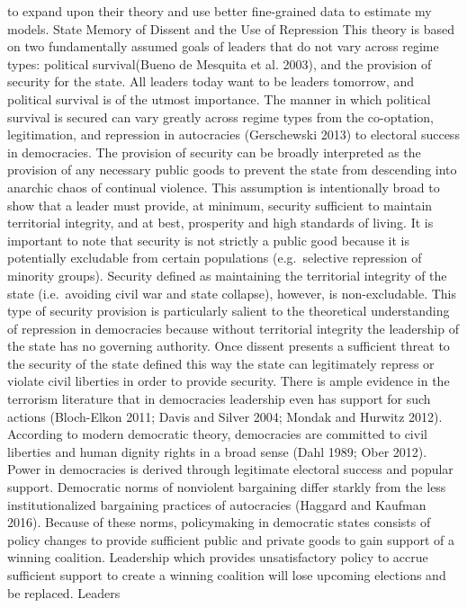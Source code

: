 \documentclass[ignorenonframetext,]{beamer}
\begin{document}
\begin{frame}[fragile]
to expand upon their theory and use better fine-grained data to estimate
my models. State Memory of Dissent and the Use of Repression This theory
is based on two fundamentally assumed goals of leaders that do not vary
across regime types: political survival(Bueno de Mesquita et al. 2003),
and the provision of security for the state. All leaders today want to
be leaders tomorrow, and political survival is of the utmost importance.
The manner in which political survival is secured can vary greatly
across regime types from the co-optation, legitimation, and repression
in autocracies (Gerschewski 2013) to electoral success in democracies.
The provision of security can be broadly interpreted as the provision of
any necessary public goods to prevent the state from descending into
anarchic chaos of continual violence. This assumption is intentionally
broad to show that a leader must provide, at minimum, security
sufficient to maintain territorial integrity, and at best, prosperity
and high standards of living. It is important to note that security is
not strictly a public good because it is potentially excludable from
certain populations (e.g.~selective repression of minority groups).
Security defined as maintaining the territorial integrity of the state
(i.e.~avoiding civil war and state collapse), however, is
non-excludable. This type of security provision is particularly salient
to the theoretical understanding of repression in democracies because
without territorial integrity the leadership of the state has no
governing authority. Once dissent presents a sufficient threat to the
security of the state defined this way the state can legitimately
repress or violate civil liberties in order to provide security. There
is ample evidence in the terrorism literature that in democracies
leadership even has support for such actions (Bloch-Elkon 2011; Davis
and Silver 2004; Mondak and Hurwitz 2012). According to modern
democratic theory, democracies are committed to civil liberties and
human dignity rights in a broad sense (Dahl 1989; Ober 2012). Power in
democracies is derived through legitimate electoral success and popular
support. Democratic norms of nonviolent bargaining differ starkly from
the less institutionalized bargaining practices of autocracies (Haggard
and Kaufman 2016). Because of these norms, policymaking in democratic
states consists of policy changes to provide sufficient public and
private goods to gain support of a winning coalition. Leadership which
provides unsatisfactory policy to accrue sufficient support to create a
winning coalition will lose upcoming elections and be replaced. Leaders

\end{frame}
\end{document}
